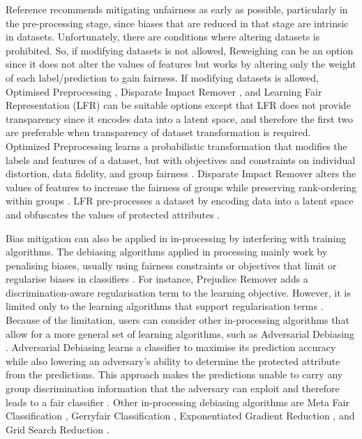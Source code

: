 \documentclass[sigconf,review]{acmart}
\begin{document}
	Reference \cite{mahoney2020ai} recommends mitigating unfairness as early as possible, particularly in the pre-processing stage, since biases that are reduced in that stage are intrinsic in datasets. Unfortunately, there are conditions where altering datasets is prohibited. So, if modifying datasets is not allowed, Reweighing \cite{kamiran2011reweighing} can be an option since it does not alter the values of features but works by altering only the weight of each label/prediction to gain fairness. If modifying datasets is allowed, Optimised Preprocessing \cite{calmon2017optimized}, Disparate Impact Remover \cite{feldman2015disparate}, and Learning Fair Representation (LFR) \cite{zemel2013lfr} can be suitable options except that LFR does not provide transparency since it encodes data into a latent space, and therefore the first two are preferable when transparency of dataset transformation is required.
	Optimized Preprocessing learns a probabilistic transformation that modifies the labels and features of a dataset, but with objectives and constraints on individual distortion, data fidelity, and group fairness \cite{mahoney2020ai,calmon2017optimized}.
	Disparate Impact Remover alters the values of features to increase the fairness of groups while preserving rank-ordering within groups \cite{mahoney2020ai,feldman2015disparate}.
	LFR pre-processes a dataset by encoding data into a latent space and obfuscates the values of protected attributes \cite{mahoney2020ai,zemel2013lfr}.
	
	Bias mitigation can also be applied in in-processing by interfering with training algorithms. The debiasing algorithms applied in processing mainly work by penalising biases, usually using fairness constraints or objectives that limit or regularise biases in classifiers \cite{mahoney2020ai}. For instance, Prejudice Remover \cite{kamishima2012prejudice} adds a discrimination-aware regularisation term to the learning objective. However, it is limited only to the learning algorithms that support regularisation terms \cite{mahoney2020ai,ibmaif3602022guidance}. Because of the limitation, users can consider other in-processing algorithms that allow for a more general set of learning algorithms, such as Adversarial Debiasing \cite{mahoney2020ai,ibmaif3602022guidance}. Adversarial Debiasing \cite{zhang2018adversarial} learns a classifier to maximise its prediction accuracy while also lowering an adversary's ability to determine the protected attribute from the predictions. This approach makes the predictions unable to carry any group discrimination information that the adversary can exploit and therefore leads to a fair classifier \cite{ibmaif3602022guidance}. Other in-processing debiasing algorithms are Meta Fair Classification \cite{celis2019metafair}, Gerryfair Classification \cite{kearns2018gerry,kearns2019gerry}, Exponentiated Gradient Reduction \cite{agarwal18grid}, and Grid Search Reduction \cite{agarwal18grid,agarwal19grid}.
	
\end{document}
